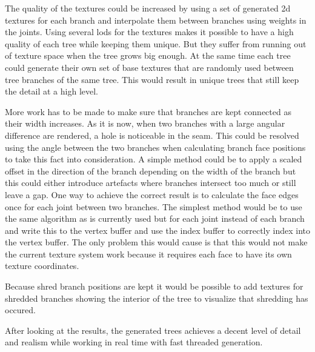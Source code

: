 \documentclass[11pt]{article} %
\begin{document}
The quality of the textures could be increased by using a set of generated 2d textures for each branch and interpolate them between branches using weights in the joints.
Using several lods for the textures makes it possible to have a high quality of each tree while keeping them unique.
But they suffer from running out of texture space when the tree grows big enough.
At the same time each tree could generate their own set of base textures that are randomly used between tree branches of the same tree.
This would result in unique trees that still keep the detail at a high level.

More work has to be made to make sure that branches are kept connected as their width increases.
As it is now, when two branches with a large angular difference are rendered, a hole is noticeable in the seam.
This could be resolved using the angle between the two branches when calculating branch face positions to take this fact into consideration.
A simple method could be to apply a scaled offset in the direction of the branch depending on the width of the branch but this could either introduce artefacts where branches intersect too much or still leave a gap.
One way to achieve the correct result is to calculate the face edges once for each joint between two branches.
The simplest method would be to use the same algorithm as is currently used but for each joint instead of each branch and write this to the vertex buffer and use the index buffer to correctly index into the vertex buffer.
The only problem this would cause is that this would not make the current texture system work because it requires each face to have its own texture coordinates.

Because shred branch positions are kept it would be possible to add textures for shredded branches showing the interior of the tree to visualize that shredding has occured.

After looking at the results, the generated trees achieves a decent level of detail and realism while working in real time with fast threaded generation.



\end{document}
